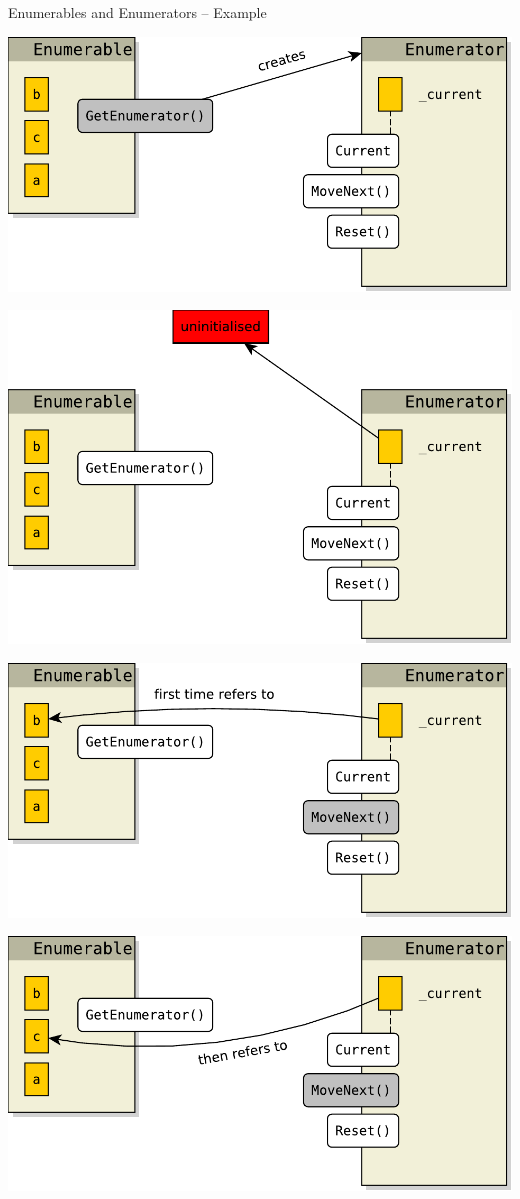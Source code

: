 \documentclass[presentation]{beamer}
\begin{document}
\begin{frame}[allowframebreaks]{Enumerables and Enumerators -- Example}\centering

  \includegraphics[width=.8\linewidth]{img/enumeration-1.pdf}
  
  \includegraphics[width=.8\linewidth]{img/enumeration-2.pdf}
  
  \includegraphics[width=.8\linewidth]{img/enumeration-3.pdf}
  
  \includegraphics[width=.8\linewidth]{img/enumeration-4.pdf}
  

\end{frame}
\end{document}
